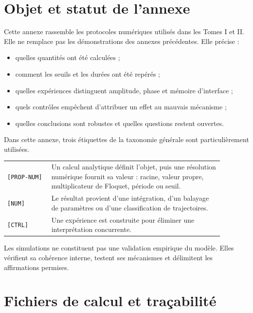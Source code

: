 \section{Objet et statut de l'annexe}
\label{annexe-num-objet}

Cette annexe rassemble les protocoles numériques utilisés dans les
Tomes I et II. Elle ne remplace pas les démonstrations des annexes
précédentes. Elle précise :

\begin{itemize}
\item
  quelles quantités ont été calculées ;
\item
  comment les seuils et les durées ont été repérés ;
\item
  quelles expériences distinguent amplitude, phase et mémoire
  d'interface ;
\item
  quels contrôles empêchent d'attribuer un effet au mauvais
  mécanisme ;
\item
  quelles conclusions sont robustes et quelles questions restent
  ouvertes.
\end{itemize}

Dans cette annexe, trois étiquettes de la taxonomie générale sont particulièrement utilisées.

\begin{center}
\begin{tabular}{p{0.18\linewidth}p{0.70\linewidth}}
\hline
\texttt{[PROP-NUM]}
&
Un calcul analytique définit l'objet, puis une résolution numérique
fournit sa valeur : racine, valeur propre, multiplicateur de Floquet,
période ou seuil.
\\
\texttt{[NUM]}
&
Le résultat provient d'une intégration, d'un balayage de paramètres ou
d'une classification de trajectoires.
\\
\texttt{[CTRL]}
&
Une expérience est construite pour éliminer une interprétation
concurrente.
\\
\hline
\end{tabular}
\end{center}

Les simulations ne constituent pas une validation empirique du modèle.
Elles vérifient sa cohérence interne, testent ses mécanismes et
délimitent les affirmations permises.

\section{Fichiers de calcul et traçabilité}
\label{annexe-num-tracabilite}

